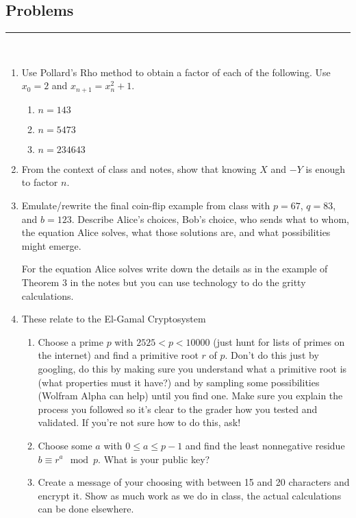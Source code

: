 \documentclass[class=article, crop=false]{standalone}
\begin{document}
\subsection{Problems}
\rule{\textwidth}{1pt}\\
\begin{enumerate}
\item
	Use Pollard's Rho method
	to obtain a factor of each of the following.
	Use $x_0=2$ and $x_{n+1}=x_n^2+1$.

	\begin{enumerate}

	\item
		$n=143$

	\item
		$n=5473$

	\item
		$n = 234643$

	\end{enumerate}


\item
	From the context of class and notes,
	show that knowing $X$ and $-Y$ is enough to factor $n$.

\item
	Emulate/rewrite the final coin-flip example from class
	with $p=67$, $q=83$, and $b=123$.
	Describe Alice's choices, Bob's choice,
	who sends what to whom,
	the equation Alice solves,
	what those solutions are,
	and what possibilities might emerge.

	For the equation Alice solves
	write down the details as in the example of Theorem 3
	in the notes
	but you can use technology to do the gritty calculations.

\item
	These relate to the El-Gamal Cryptosystem
	\begin{enumerate}
	\item
		Choose a prime $p$ with $2525<p<10000$
		(just hunt for lists of primes on the internet)
		and find a primitive root $r$ of $p$.
		Don't do this just by googling,
		do this by making sure you understand what a primitive root is
		(what properties must it have?)
		and by sampling some possibilities (Wolfram Alpha can help)
		until you find one.
		Make sure you explain the process you followed
		so it's clear to the grader how you tested and validated.
		If you're not sure how to do this, ask!

	\item
		Choose some $a$ with $0\leq a\leq p-1$ and find the least nonnegative
		residue $b\equiv r^a\mod p$.
		What is your public key?

	\item
		Create a message of your choosing with between 15 and 20 characters
		and encrypt it.
		Show as much work as we do in class,
		the actual calculations can be done elsewhere.

\end{enumerate}
	
	\end{enumerate}
\end{document}
